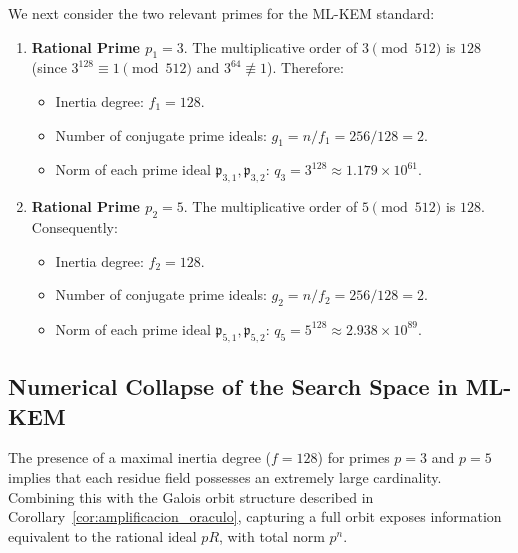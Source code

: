 \documentclass[11pt,a4paper]{article}
\theoremstyle{plain}
\theoremstyle{definition}
\numberwithin{equation}{section}
\newcommand{\fkp}{\mathfrak{p}}
\begin{document}
We next consider the two relevant primes for the ML-KEM standard:

\begin{enumerate}
    \item \textbf{Rational Prime $p_1 = 3$}. The multiplicative order of $3 \pmod{512}$ is $128$ (since $3^{128} \equiv 1 \pmod{512}$ and $3^{64} \not\equiv 1$). Therefore:
    \begin{itemize}
        \item Inertia degree: $f_1 = 128$.
        \item Number of conjugate prime ideals: $g_1 = n / f_1 = 256 / 128 = 2$.
        \item Norm of each prime ideal $\fkp_{3,1}, \fkp_{3,2}$: $q_3 = 3^{128} \approx 1.179 \times 10^{61}$.
    \end{itemize}

    \item \textbf{Rational Prime $p_2 = 5$}. The multiplicative order of $5 \pmod{512}$ is $128$. Consequently:
    \begin{itemize}
        \item Inertia degree: $f_2 = 128$.
        \item Number of conjugate prime ideals: $g_2 = n / f_2 = 256 / 128 = 2$.
        \item Norm of each prime ideal $\fkp_{5,1}, \fkp_{5,2}$: $q_5 = 5^{128} \approx 2.938 \times 10^{89}$.
    \end{itemize}
\end{enumerate}

\subsection{Numerical Collapse of the Search Space in ML-KEM}
\label{subsec:colapso_mlkem}

The presence of a maximal inertia degree ($f = 128$) for primes $p=3$ and $p=5$ implies that each residue field possesses an extremely large cardinality. Combining this with the Galois orbit structure described in Corollary~\ref{cor:amplificacion_oraculo}, capturing a full orbit exposes information equivalent to the rational ideal $pR$, with total norm $p^n$.
\end{document}
